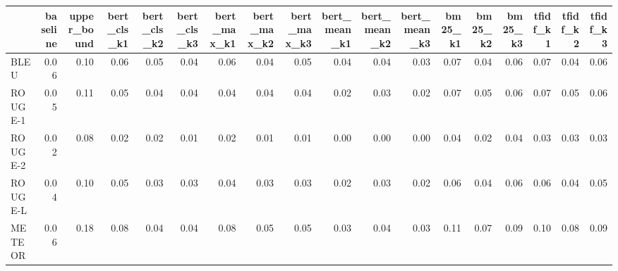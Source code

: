 \begin{tabular}{lrrrrrrrrrrrrrrrrr}
\toprule
 & baseline & upper_bound & bert_cls_k1 & bert_cls_k2 & bert_cls_k3 & bert_max_k1 & bert_max_k2 & bert_max_k3 & bert_mean_k1 & bert_mean_k2 & bert_mean_k3 & bm25_k1 & bm25_k2 & bm25_k3 & tfidf_k1 & tfidf_k2 & tfidf_k3 \\
\midrule
BLEU & 0.06 & 0.10 & 0.06 & 0.05 & 0.04 & 0.06 & 0.04 & 0.05 & 0.04 & 0.04 & 0.03 & 0.07 & 0.04 & 0.06 & 0.07 & 0.04 & 0.06 \\
ROUGE-1 & 0.05 & 0.11 & 0.05 & 0.04 & 0.04 & 0.04 & 0.04 & 0.04 & 0.02 & 0.03 & 0.02 & 0.07 & 0.05 & 0.06 & 0.07 & 0.05 & 0.06 \\
ROUGE-2 & 0.02 & 0.08 & 0.02 & 0.02 & 0.01 & 0.02 & 0.01 & 0.01 & 0.00 & 0.00 & 0.00 & 0.04 & 0.02 & 0.04 & 0.03 & 0.03 & 0.03 \\
ROUGE-L & 0.04 & 0.10 & 0.05 & 0.03 & 0.03 & 0.04 & 0.03 & 0.03 & 0.02 & 0.03 & 0.02 & 0.06 & 0.04 & 0.06 & 0.06 & 0.04 & 0.05 \\
METEOR & 0.06 & 0.18 & 0.08 & 0.04 & 0.04 & 0.08 & 0.05 & 0.05 & 0.03 & 0.04 & 0.03 & 0.11 & 0.07 & 0.09 & 0.10 & 0.08 & 0.09 \\
\bottomrule
\end{tabular}
